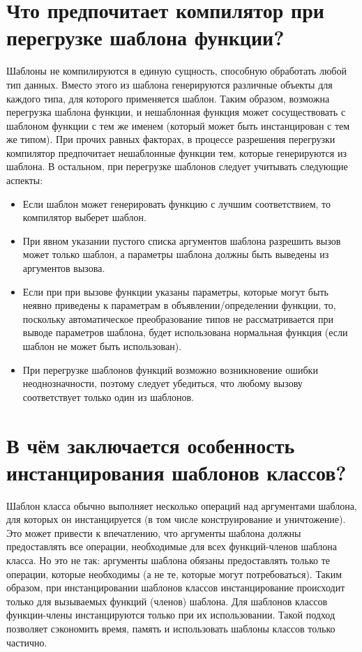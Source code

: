 \documentclass[a4paper,12pt]{article}	%
\begin{document}
\newpage

\section{Что предпочитает компилятор при перегрузке шаблона функции?}
	
	Шаблоны не компилируются в единую сущность, способную обработать любой тип данных. Вместо этого из шаблона генерируются различные объекты для каждого типа, для которого применяется шаблон. Таким образом, возможна перегрузка шаблона функции, и нешаблонная функция может сосуществовать с шаблоном функции с тем же именем (который может быть инстанцирован с тем же типом). При прочих равных факторах, в процессе разрешения перегрузки компилятор предпочитает нешаблонные функции тем, которые генерируются из шаблона. В остальном, при перегрузке шаблонов следует учитывать следующие аспекты:
	
	\begin{itemize}
	
		\item Если шаблон может генерировать функцию с лучшим соответствием, то компилятор выберет шаблон.
	
		\item При явном указании пустого списка аргументов шаблона разрешить вызов может только шаблон, а параметры шаблона
должны быть выведены из аргументов вызова.

		\item Если при при вызове функции указаны параметры, которые могут быть неявно приведены к параметрам в объявлении/определении функции, то, поскольку автоматическое преобразование типов не рассматривается при выводе параметров шаблона, будет использована нормальная функция (если шаблон не может быть использован).
		
		\item При перегрузке шаблонов функций возможно возникновение ошибки неоднозначности, поэтому следует убедиться, что любому вызову соответствует только один из шаблонов.
	
	\end{itemize}

\newpage

\section{В чём заключается особенность инстанцирования шаблонов классов?}

	Шаблон класса обычно выполняет несколько операций над аргументами шаблона, для которых он инстанцируется (в том числе конструирование и уничтожение). Это может привести к впечатлению, что аргументы шаблона должны предоставлять все операции, необходимые для всех функций-членов шаблона класса. Но это не так: аргументы шаблона обязаны предоставлять только те операции, которые необходимы (а не те, которые могут потребоваться).	Таким образом, при инстанцировании шаблонов классов инстанцирование происходит только для вызываемых функций (членов) шаблона. Для шаблонов классов функции-члены инстанцируются только при их использовании. Такой подход позволяет сэкономить время, память и использовать шаблоны классов только частично. 	
	
\end{document}
